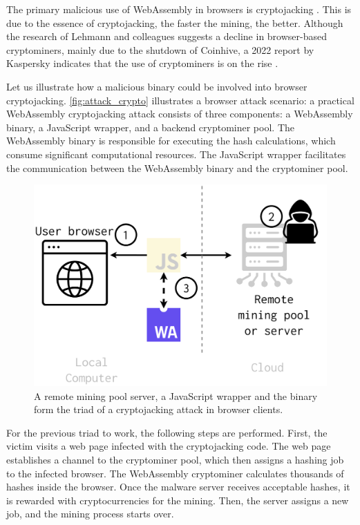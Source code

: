 \label{offensive_app}

The primary malicious use of WebAssembly in browsers is cryptojacking \cite{musch2019new}. 
This is due to the essence of cryptojacking, the faster the mining, the better. 
Although the research of Lehmann and colleagues \cite{Hilbig2021AnES} suggests a decline in browser-based cryptominers, mainly due to the shutdown of Coinhive, a 2022 report by Kaspersky indicates that the use of cryptominers is on the rise \cite{kasperksy}. 


Let us illustrate how a malicious \wasm binary could be involved into browser cryptojacking.
\autoref{fig:attack_crypto} illustrates a browser attack scenario:
a practical WebAssembly cryptojacking attack consists of three components: a WebAssembly binary, a JavaScript wrapper, and a backend cryptominer pool. 
The WebAssembly binary is responsible for executing the hash calculations, which consume significant computational resources. 
The JavaScript wrapper facilitates the communication between the WebAssembly binary and the cryptominer pool.

\begin{figure}[h]
    \centering
    \includegraphics[width=0.6\linewidth]{figures/attack_crypto.pdf}
    \caption{A remote mining pool server, a JavaScript wrapper and the \Wasm binary form the triad of a cryptojacking attack in browser clients.}
    \label{fig:attack_crypto}
\end{figure}

For the previous triad to work, the following steps are performed.
First, the victim visits a web page infected with the cryptojacking code. 
The web page establishes a channel to the cryptominer pool, which then assigns a hashing job to the infected browser. 
The WebAssembly cryptominer calculates thousands of hashes inside the browser. 
Once the malware server receives acceptable hashes, it is rewarded with cryptocurrencies for the mining. 
Then, the server assigns a new job, and the mining process starts over.

